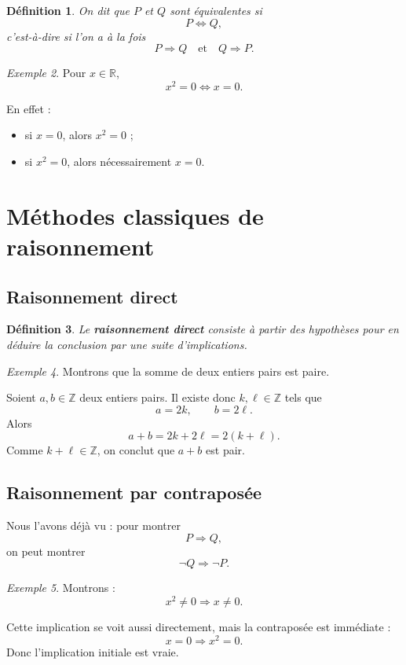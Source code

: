 \documentclass[11pt,a4paper]{article}
\newtheorem{definition}{Définition}[section]
\theoremstyle{remark}
\newtheorem{exemple}[definition]{Exemple}
\newcommand{\R}{\mathbb{R}}
\newcommand{\Z}{\mathbb{Z}}
\begin{document}
\begin{definition}
On dit que \(P\) et \(Q\) sont équivalentes si
\[
P\Longleftrightarrow Q,
\]
c’est-à-dire si l’on a à la fois
\[
P\Longrightarrow Q
\quad \text{et} \quad
Q\Longrightarrow P.
\]
\end{definition}

\begin{exemple}
Pour \(x\in\R\),
\[
x^2=0 \Longleftrightarrow x=0.
\]

En effet :
\begin{itemize}
    \item si \(x=0\), alors \(x^2=0\) ;
    \item si \(x^2=0\), alors nécessairement \(x=0\).
\end{itemize}
\end{exemple}

\section{Méthodes classiques de raisonnement}

\subsection{Raisonnement direct}

\begin{definition}
Le \textbf{raisonnement direct} consiste à partir des hypothèses pour en déduire la conclusion par une suite d’implications.
\end{definition}

\begin{exemple}
Montrons que la somme de deux entiers pairs est paire.

Soient \(a,b\in\Z\) deux entiers pairs. Il existe donc \(k,\ell\in\Z\) tels que
\[
a=2k,\qquad b=2\ell.
\]
Alors
\[
a+b=2k+2\ell=2(k+\ell).
\]
Comme \(k+\ell\in\Z\), on conclut que \(a+b\) est pair.
\end{exemple}

\subsection{Raisonnement par contraposée}

Nous l’avons déjà vu : pour montrer
\[
P\Longrightarrow Q,
\]
on peut montrer
\[
\neg Q \Longrightarrow \neg P.
\]

\begin{exemple}
Montrons :
\[
x^2\neq 0 \Longrightarrow x\neq 0.
\]

Cette implication se voit aussi directement, mais la contraposée est immédiate :
\[
x=0 \Longrightarrow x^2=0.
\]
Donc l’implication initiale est vraie.
\end{exemple}
\end{document}
